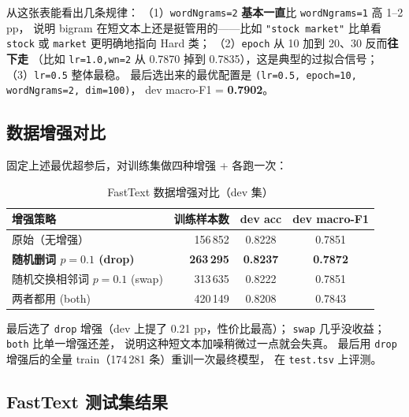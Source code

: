 \documentclass{SYSUReport}
\begin{document}
从这张表能看出几条规律：
（1）\texttt{wordNgrams=2} \textbf{基本一直}比 \texttt{wordNgrams=1} 高 1–2 pp，
说明 bigram 在短文本上还是挺管用的——比如 \texttt{"stock market"} 比单看 \texttt{stock}
或 \texttt{market} 更明确地指向 Hard 类；
（2）\texttt{epoch} 从 10 加到 20、30 反而\textbf{往下走}
（比如 \texttt{lr=1.0,wn=2} 从 0.7870 掉到 0.7835），这是典型的过拟合信号；
（3）\texttt{lr=0.5} 整体最稳。
最后选出来的最优配置是 \texttt{(lr=0.5, epoch=10, wordNgrams=2, dim=100)}，
dev macro-F1 = \textbf{0.7902}。

\subsection{数据增强对比}

固定上述最优超参后，对训练集做四种增强 + 各跑一次：

\begin{table}[!htbp]
\centering
\caption{FastText 数据增强对比（dev 集）}
\label{tab:ft-aug}
\begin{tabular}{lrcc}
\toprule
增强策略         & 训练样本数 & dev acc & dev macro-F1 \\
\midrule
原始（无增强）   & 156\,852 & 0.8228 & 0.7851 \\
\textbf{随机删词 $p=0.1$ \quad (drop)} & \textbf{263\,295} & \textbf{0.8237} & \textbf{0.7872} \\
随机交换相邻词 $p=0.1$ \quad (swap) & 313\,635 & 0.8222 & 0.7851 \\
两者都用 \quad (both)              & 420\,149 & 0.8208 & 0.7843 \\
\bottomrule
\end{tabular}
\end{table}

最后选了 \texttt{drop} 增强（dev 上提了 0.21 pp，性价比最高）；
\texttt{swap} 几乎没收益；\texttt{both} 比单一增强还差，
说明这种短文本加噪稍微过一点就会失真。
最后用 \texttt{drop} 增强后的全量 train（174\,281 条）重训一次最终模型，
在 \texttt{test.tsv} 上评测。

\subsection{FastText 测试集结果}
\end{document}
